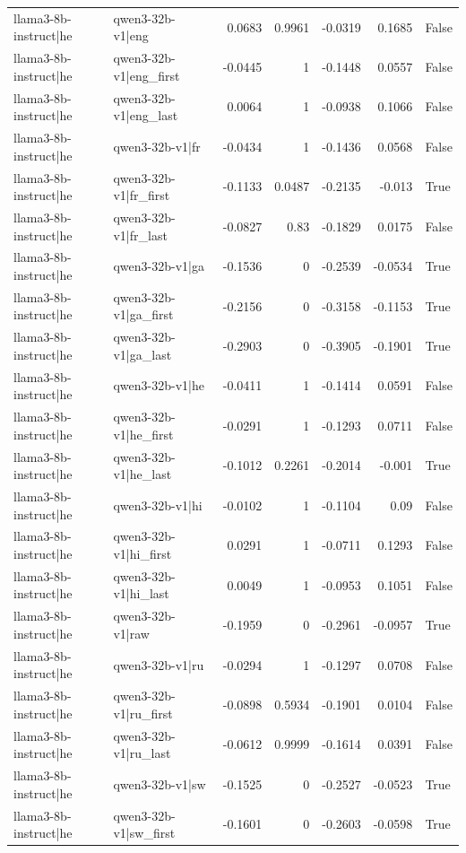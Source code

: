 \begin{table}
\begin{tabular}{l l r r r r l}
llama3-8b-instruct|he & qwen3-32b-v1|eng & 0.0683 & 0.9961 & -0.0319 & 0.1685 & False \\
llama3-8b-instruct|he & qwen3-32b-v1|eng_first & -0.0445 & 1 & -0.1448 & 0.0557 & False \\
llama3-8b-instruct|he & qwen3-32b-v1|eng_last & 0.0064 & 1 & -0.0938 & 0.1066 & False \\
llama3-8b-instruct|he & qwen3-32b-v1|fr & -0.0434 & 1 & -0.1436 & 0.0568 & False \\
llama3-8b-instruct|he & qwen3-32b-v1|fr_first & -0.1133 & 0.0487 & -0.2135 & -0.013 & True \\
llama3-8b-instruct|he & qwen3-32b-v1|fr_last & -0.0827 & 0.83 & -0.1829 & 0.0175 & False \\
llama3-8b-instruct|he & qwen3-32b-v1|ga & -0.1536 & 0 & -0.2539 & -0.0534 & True \\
llama3-8b-instruct|he & qwen3-32b-v1|ga_first & -0.2156 & 0 & -0.3158 & -0.1153 & True \\
llama3-8b-instruct|he & qwen3-32b-v1|ga_last & -0.2903 & 0 & -0.3905 & -0.1901 & True \\
llama3-8b-instruct|he & qwen3-32b-v1|he & -0.0411 & 1 & -0.1414 & 0.0591 & False \\
llama3-8b-instruct|he & qwen3-32b-v1|he_first & -0.0291 & 1 & -0.1293 & 0.0711 & False \\
llama3-8b-instruct|he & qwen3-32b-v1|he_last & -0.1012 & 0.2261 & -0.2014 & -0.001 & True \\
llama3-8b-instruct|he & qwen3-32b-v1|hi & -0.0102 & 1 & -0.1104 & 0.09 & False \\
llama3-8b-instruct|he & qwen3-32b-v1|hi_first & 0.0291 & 1 & -0.0711 & 0.1293 & False \\
llama3-8b-instruct|he & qwen3-32b-v1|hi_last & 0.0049 & 1 & -0.0953 & 0.1051 & False \\
llama3-8b-instruct|he & qwen3-32b-v1|raw & -0.1959 & 0 & -0.2961 & -0.0957 & True \\
llama3-8b-instruct|he & qwen3-32b-v1|ru & -0.0294 & 1 & -0.1297 & 0.0708 & False \\
llama3-8b-instruct|he & qwen3-32b-v1|ru_first & -0.0898 & 0.5934 & -0.1901 & 0.0104 & False \\
llama3-8b-instruct|he & qwen3-32b-v1|ru_last & -0.0612 & 0.9999 & -0.1614 & 0.0391 & False \\
llama3-8b-instruct|he & qwen3-32b-v1|sw & -0.1525 & 0 & -0.2527 & -0.0523 & True \\
llama3-8b-instruct|he & qwen3-32b-v1|sw_first & -0.1601 & 0 & -0.2603 & -0.0598 & True \\

\end{tabular}
\end{table}
